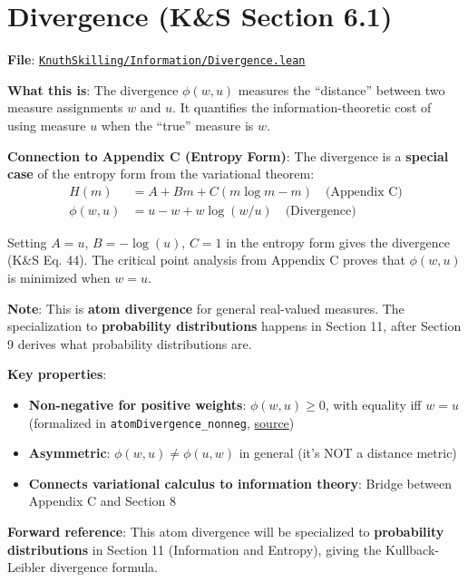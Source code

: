 \documentclass[11pt]{article}
\theoremstyle{definition}
\theoremstyle{remark}
\begin{document}
\section{Divergence (K\&S Section 6.1)}

\textbf{File}: \href{https://github.com/zariuq/ks-foundations-of-inference/blob/main/KnuthSkilling/Information/Divergence.lean}{\texttt{KnuthSkilling/Information/Divergence.lean}}

\textbf{What this is}: The divergence $\phi(w, u)$ measures the ``distance'' between two measure assignments $w$ and $u$. It quantifies the information-theoretic cost of using measure $u$ when the ``true'' measure is $w$.

\textbf{Connection to Appendix C (Entropy Form)}: The divergence is a \textbf{special case} of the entropy form from the variational theorem:
\begin{align*}
H(m) &= A + Bm + C(m \log m - m) \quad \text{(Appendix C)} \\
\phi(w, u) &= u - w + w \log(w/u) \quad \text{(Divergence)}
\end{align*}

Setting $A = u$, $B = -\log(u)$, $C = 1$ in the entropy form gives the divergence (K\&S Eq. 44). The critical point analysis from Appendix C proves that $\phi(w, u)$ is minimized when $w = u$.

\textbf{Note}: This is \textbf{atom divergence} for general real-valued measures. The specialization to \textbf{probability distributions} happens in Section 11, after Section 9 derives what probability distributions are.

\textbf{Key properties}:
\begin{itemize}
\item \textbf{Non-negative for positive weights}: $\phi(w, u) \geq 0$, with equality iff $w = u$ (formalized in \texttt{atomDivergence\_nonneg}, \href{https://github.com/zariuq/ks-foundations-of-inference/blob/main/KnuthSkilling/Information/Divergence.lean}{source})
\item \textbf{Asymmetric}: $\phi(w, u) \neq \phi(u, w)$ in general (it's NOT a distance metric)
\item \textbf{Connects variational calculus to information theory}: Bridge between Appendix C and Section 8
\end{itemize}

\textbf{Forward reference}: This atom divergence will be specialized to \textbf{probability distributions} in Section 11 (Information and Entropy), giving the Kullback-Leibler divergence formula.
\end{document}
